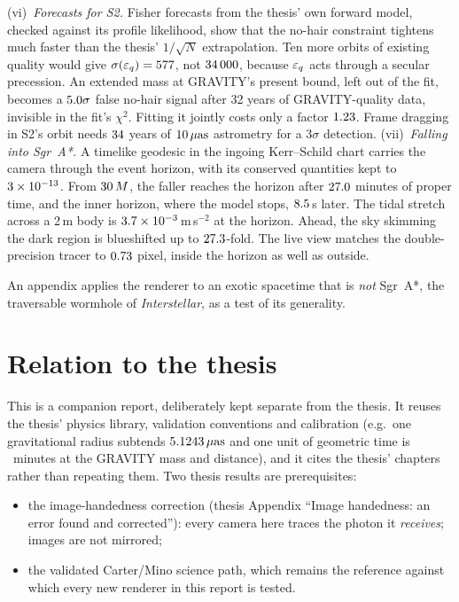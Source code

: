 (vi)~\emph{Forecasts for S2.} Fisher forecasts from the thesis' own forward
model, checked against its profile likelihood, show that the no-hair
constraint tightens much faster than the thesis' $1/\sqrt{N}$ extrapolation.
Ten more orbits of existing quality would give $\sigma(\varepsilon_q) = 577$,
not $34\,000$, because $\varepsilon_q$ acts through a secular precession. An
extended mass at GRAVITY's present bound, left out of the fit, becomes a
$5.0\sigma$ false no-hair signal after 32 years of
GRAVITY-quality data, invisible in the fit's $\chi^2$. Fitting it jointly
costs only a factor $1.23$. Frame dragging in S2's orbit needs
$34$ years of $10\,\mu\mathrm{as}$ astrometry for a $3\sigma$ detection.
(vii)~\emph{Falling into Sgr~A*.} A timelike geodesic in the ingoing
Kerr--Schild chart carries the camera through the event horizon, with its
conserved quantities kept to $3\times10^{-13}$. From $30\,M$, the faller
reaches the horizon after $27.0$ minutes of proper time, and the
inner horizon, where the model stops, $8.5$\,s later. The tidal
stretch across a 2\,m body is $3.7\times10^{-3}$\,m\,s$^{-2}$ at the horizon.
Ahead, the sky skimming the dark region is blueshifted up to
$27.3$-fold. The live view matches the double-precision
tracer to $0.73$ pixel, inside the horizon as well as outside.

An appendix applies the renderer to an exotic spacetime that is \emph{not}
Sgr~A*, the traversable wormhole of \emph{Interstellar}, as a test of its
generality.

\chapter*{Relation to the thesis}

This is a companion report, deliberately kept separate from the thesis. It
reuses the thesis' physics library, validation conventions and calibration
(e.g.\ one gravitational radius subtends $5.1243\,\mu\mathrm{as}$ and one unit of
geometric time is \XMinPerM\ minutes at the GRAVITY mass and distance), and it
cites the thesis' chapters rather than repeating them. Two thesis results are
prerequisites:

\begin{itemize}
\item the image-handedness correction (thesis Appendix ``Image handedness:
an error found and corrected''): every camera here traces the photon it
\emph{receives}; images are not mirrored;
\item the validated Carter/Mino science path, which remains the reference
against which every new renderer in this report is tested.
\end{itemize}

